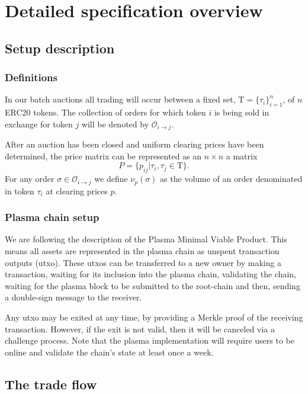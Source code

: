 \documentclass[11pt,parskip=full]{scrartcl}%
\newcommand{\Tau}{\mathrm{T}}
\def\pO{\mathcal{O}}
\def\ra{\rightarrow}
\newcommand*{\erc}{ERC20 }
\begin{document}
\newpage

\section{Detailed specification overview}
\subsection{Setup description}

\subsubsection{Definitions}


In our batch auctions all trading will occur between a fixed set, $\Tau = \{\tau_i\}_{i=1}^n$, of $n$ \erc tokens. The collection of orders for which token $i$ is being sold in exchange for token $j$ will be denoted by $\pO_{i\ra j}$. 

After an auction has been closed and uniform clearing prices have been determined, the price matrix can be represented as an $n\times n$ a matrix 
\[P = \{p_{ij}| \tau_i, \tau_j \in \Tau \}.\]
For any order $\sigma \in \pO_{i\ra j}$ we define $\nu_p(\sigma)$ as the volume of an order denominated in token $\tau_i$ at clearing prices $p$.


\subsubsection{Plasma chain setup}
We are following the description of the Plasma Minimal Viable Product\cite{MVP}. 
This means all assets are represented in the plasma chain as unspent transaction outputs (utxo). 
These utxos can be transferred to a new owner by making a transaction, waiting for its inclusion into the plasma chain, validating the chain, waiting for the plasma block to be submitted to the root-chain and then, sending a double-sign message to the receiver. 

Any utxo may be exited at any time, by providing a Merkle proof of the receiving transaction. 
However, if the exit is not valid, then it will be canceled via a challenge process.
Note that the plasma implementation will require users to be online and validate the chain's state at least once a week.


\subsection{The trade flow}
\label{subsec:data}
\end{document}
